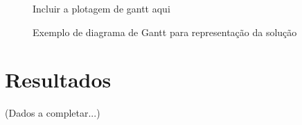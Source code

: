     \begin{figure}[h]
        \centering
        \small{Incluir a plotagem de gantt aqui}
        \caption{Exemplo de diagrama de Gantt para representação da solução}
        \label{fig:exemplo-gantt}
    \end{figure}
    


\section{Resultados}
    (Dados a completar...)
